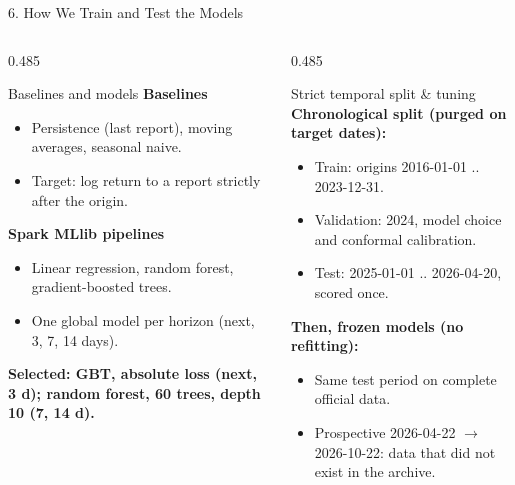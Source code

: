 \documentclass[aspectratio=169,10pt]{beamer}
\begin{document}
\begin{frame}{6. How We Train and Test the Models}
  \begin{columns}[T,onlytextwidth]
    \begin{column}{0.485\textwidth}
      \begin{block}{Baselines and models}
        \footnotesize
        \textbf{\color{refRed}Baselines}
        \begin{itemize}\scriptsize
          \item Persistence (last report), moving averages, seasonal naive.
          \item Target: log return to a report strictly after the origin.
        \end{itemize}
        \vspace{0.2em}
        \textbf{\color{refRed}Spark MLlib pipelines}
        \begin{itemize}\scriptsize
          \item Linear regression, random forest, gradient-boosted trees.
          \item One global model per horizon (next, 3, 7, 14 days).
        \end{itemize}
        \vspace{0.2em}
        {\scriptsize\color{refGreen}\textbf{Selected: GBT, absolute loss (next, 3 d); random forest, 60 trees, depth 10 (7, 14 d).}}
      \end{block}
    \end{column}

    \begin{column}{0.485\textwidth}
      \begin{block}{Strict temporal split \& tuning}
        \footnotesize
        \textbf{Chronological split (purged on target dates):}
        \begin{itemize}\scriptsize
          \item Train: origins 2016-01-01 .. 2023-12-31.
          \item Validation: 2024, model choice and conformal calibration.
          \item Test: 2025-01-01 .. 2026-04-20, scored once.
        \end{itemize}
        \vspace{0.2em}
        \textbf{Then, frozen models (no refitting):}
        \begin{itemize}\scriptsize
          \item Same test period on complete official data.
          \item Prospective 2026-04-22 $\to$ 2026-10-22: data that did not exist in the archive.
        \end{itemize}
      \end{block}
    \end{column}
  \end{columns}


\end{frame}
\end{document}
